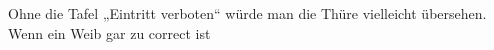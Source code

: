 Ohne die Tafel „Eintritt verboten“ würde man die Thüre vielleicht übersehen. Wenn ein Weib gar zu correct ist 
\par


